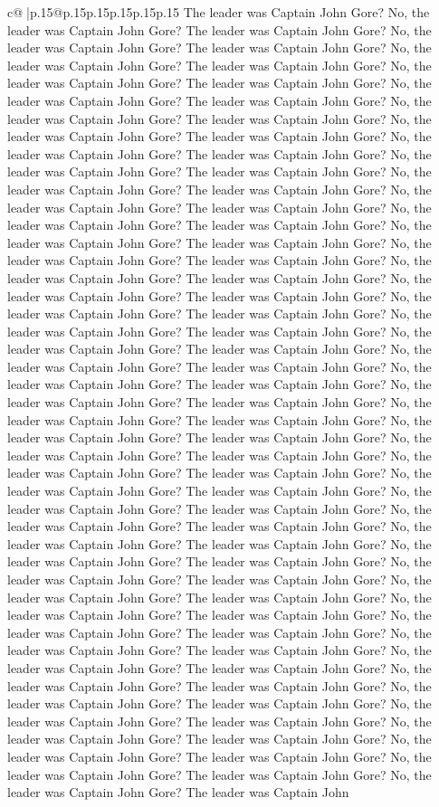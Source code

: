 \documentclass{article}
\begin{document}
{\begin{supertabular}{c@{$\;$}|p{.15\linewidth}@{}p{.15\linewidth}p{.15\linewidth}p{.15\linewidth}p{.15\linewidth}p{.15\linewidth}}
{{{The leader was Captain John Gore? No, the leader was Captain John Gore? The leader was Captain John Gore? No, the leader was Captain John Gore? The leader was Captain John Gore? No, the leader was Captain John Gore? The leader was Captain John Gore? No, the leader was Captain John Gore? The leader was Captain John Gore? No, the leader was Captain John Gore? The leader was Captain John Gore? No, the leader was Captain John Gore? The leader was Captain John Gore? No, the leader was Captain John Gore? The leader was Captain John Gore? No, the leader was Captain John Gore? The leader was Captain John Gore? No, the leader was Captain John Gore? The leader was Captain John Gore? No, the leader was Captain John Gore? The leader was Captain John Gore? No, the leader was Captain John Gore? The leader was Captain John Gore? No, the leader was Captain John Gore? The leader was Captain John Gore? No, the leader was Captain John Gore? The leader was Captain John Gore? No, the leader was Captain John Gore? The leader was Captain John Gore? No, the leader was Captain John Gore? The leader was Captain John Gore? No, the leader was Captain John Gore? The leader was Captain John Gore? No, the leader was Captain John Gore? The leader was Captain John Gore? No, the leader was Captain John Gore? The leader was Captain John Gore? No, the leader was Captain John Gore? The leader was Captain John Gore? No, the leader was Captain John Gore? The leader was Captain John Gore? No, the leader was Captain John Gore? The leader was Captain John Gore? No, the leader was Captain John Gore? The leader was Captain John Gore? No, the leader was Captain John Gore? The leader was Captain John Gore? No, the leader was Captain John Gore? The leader was Captain John Gore? No, the leader was Captain John Gore? The leader was Captain John Gore? No, the leader was Captain John Gore? The leader was Captain John Gore? No, the leader was Captain John Gore? The leader was Captain John Gore? No, the leader was Captain John Gore? The leader was Captain John Gore? No, the leader was Captain John Gore? The leader was Captain John Gore? No, the leader was Captain John Gore? The leader was Captain John Gore? No, the leader was Captain John Gore? The leader was Captain John Gore? No, the leader was Captain John Gore? The leader was Captain John Gore? No, the leader was Captain John Gore? The leader was Captain John Gore? No, the leader was Captain John Gore? The leader was Captain John Gore? No, the leader was Captain John Gore? The leader was Captain John Gore? No, the leader was Captain John Gore? The leader was Captain John Gore? No, the leader was Captain John Gore? The leader was Captain John Gore? No, the leader was Captain John Gore? The leader was Captain John Gore? No, the leader was Captain John Gore? The leader was Captain John Gore? No, the leader was Captain John Gore? The leader was Captain John Gore? No, the leader was Captain John Gore? The leader was Captain John Gore? No, the leader was Captain John Gore? The leader was Captain John Gore? No, the leader was Captain John Gore? The leader was Captain John Gore? No, the leader was Captain John Gore? The leader was Captain John }}}
\end{supertabular}}
\end{document}
